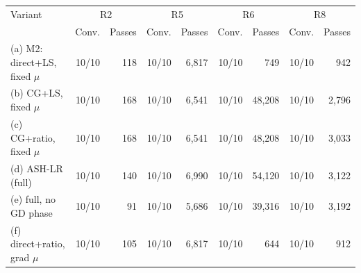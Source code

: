\begin{tabular}{lrrrrrrrr}
\toprule
Variant & \multicolumn{2}{c}{R2} & \multicolumn{2}{c}{R5} & \multicolumn{2}{c}{R6} & \multicolumn{2}{c}{R8} \\
 & Conv. & Passes & Conv. & Passes & Conv. & Passes & Conv. & Passes \\
\midrule
(a) M2: direct+LS, fixed $\mu$ & 10/10 & 118 & 10/10 & 6,817 & 10/10 & 749 & 10/10 & 942 \\
(b) CG+LS, fixed $\mu$ & 10/10 & 168 & 10/10 & 6,541 & 10/10 & 48,208 & 10/10 & 2,796 \\
(c) CG+ratio, fixed $\mu$ & 10/10 & 168 & 10/10 & 6,541 & 10/10 & 48,208 & 10/10 & 3,033 \\
(d) ASH-LR (full) & 10/10 & 140 & 10/10 & 6,990 & 10/10 & 54,120 & 10/10 & 3,122 \\
(e) full, no GD phase & 10/10 & 91 & 10/10 & 5,686 & 10/10 & 39,316 & 10/10 & 3,192 \\
(f) direct+ratio, grad $\mu$ & 10/10 & 105 & 10/10 & 6,817 & 10/10 & 644 & 10/10 & 912 \\
\bottomrule
\end{tabular}